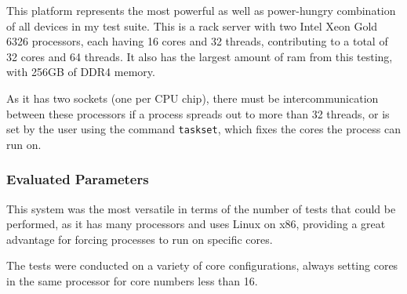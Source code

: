 This platform represents the most powerful as well as power-hungry combination of all devices in my test suite. This is a rack server with two Intel Xeon Gold 6326 processors, each having 16 cores and 32 threads, contributing to a total of 32 cores and 64 threads. It also has the largest amount of \gls{ram} from this testing, with 256GB of \gls{DDR4} memory.

As it has two sockets (one per CPU chip), there must be intercommunication between these processors if a process spreads out to more than 32 threads, or is set by the user using the command \texttt{taskset}, which fixes the cores the process can run on.



\subsubsection{Evaluated Parameters}

This system was the most versatile in terms of the number of tests that could be performed, as it has many processors and uses Linux on x86, providing a great advantage for forcing processes to run on specific cores.

The tests were conducted on a variety of core configurations, always setting cores in the same processor for core numbers less than 16.

